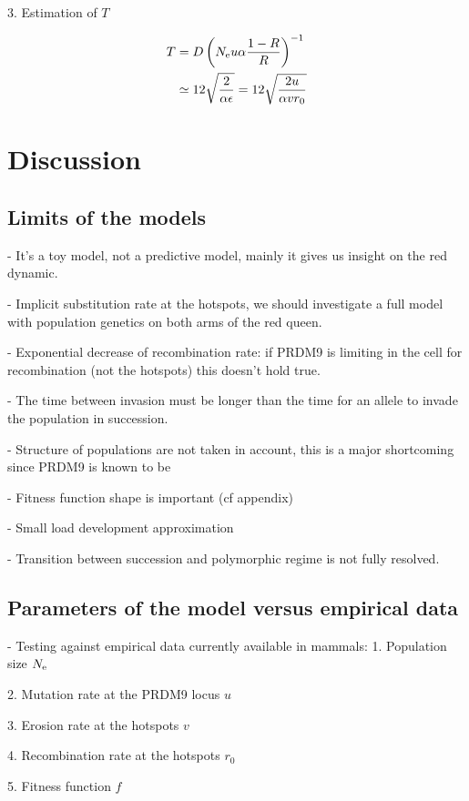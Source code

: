 \documentclass{article}
\begin{document}
3. Estimation of $ T $

\begin{align}
   T &= D \left( N_\mathrm{e} u \alpha \dfrac{1-R }{R }   \right)^{-1} \\
    &\simeq 12 \sqrt{\dfrac{2 }{\alpha \epsilon }} =  12 \sqrt{\dfrac{2 u }{\alpha v r_0}}
\end{align}

\section*{Discussion}

\subsection*{Limits of the models}

- It's a toy model, not a predictive model, mainly it gives us insight on the red dynamic.

- Implicit substitution rate at the hotspots, we should investigate a full model with population genetics on both arms of the red queen.

- Exponential decrease of recombination rate: if PRDM9 is limiting in the cell for recombination (not the hotspots) this doesn't hold true.

- The time between invasion must be longer than the time for an allele to invade the population in succession. 

- Structure of populations are not taken in account, this is a major shortcoming since PRDM9 is known to be 

- Fitness function shape is important (cf appendix)

- Small load development approximation

- Transition between succession and polymorphic regime is not fully resolved.



\subsection*{Parameters of the model versus empirical data}
- Testing against empirical data currently available in mammals: 
1. Population size $N_\mathrm{e}$

2. Mutation rate at the PRDM9 locus $u$

3. Erosion rate at the hotspots $v$

4. Recombination rate at the hotspots $r_0$

5. Fitness function $f$
\end{document}
